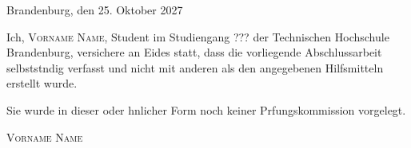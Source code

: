 \thispagestyle{empty}

\large
\begin{flushright}
  Brandenburg, den 25. Oktober 2027
\end{flushright}

\vspace*{50mm}
Ich, {\scshape Vorname Name}, Student im Studiengang ??? der
Technischen Hochschule Brandenburg, versichere an Eides statt, dass die vorliegende
Abschlussarbeit selbststndig verfasst und nicht mit anderen als den
angegebenen Hilfsmitteln erstellt wurde.

Sie wurde in dieser oder hnlicher Form noch keiner Prfungskommission
vorgelegt.\\

\vspace*{50mm}

\begin{flushright}
  {\scshape Vorname Name}
\end{flushright}

\normalsize